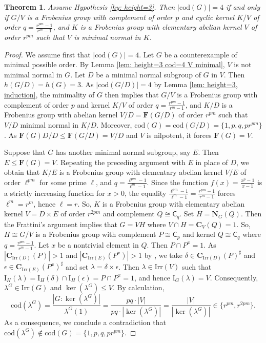 \documentclass[9pt]{article}
\newtheorem{thm}[lem]{\bf Theorem}
\begin{document}
\begin{thm}\label{thm: height=3}
	Assume Hypothesis \ref{hy: height=3}.
	Then $|\mathrm{cod}(G)|=4$
	if and only if $G/V$ is a Frobenius group with complement of order $p$ and cyclic kernel $K/V$
	of order $q=\frac{r^{pm}-1}{r^m-1}$,
	and $K$ is a Frobenius group with elementary abelian kernel $V$ of order $r^{pm}$ such that $V$ is minimal normal in $K$.	
\end{thm}
\begin{proof}
	We assume first that $|\mathrm{cod}(G)|=4$.
    Let $G$ be a counterexample of minimal possible order.
    By Lemma \ref{lem: height=3 cod=4 V minimal}, $V$ is not minimal normal in $G$.
	Let $D$ be a minimal normal subgroup of $G$ in $V$.
	Then $h(G/D)=h(G)=3$.
    As $|\mathrm{cod}(G/D)|=4$ by Lemma \ref{lem: height=3, induction},
    the minimality of $G$ then implies that
	$G/V$ is a Frobenius group with complement of order $p$ and kernel $K/V$
	of order $q=\frac{r^{pm}-1}{r^m-1}$,
	and $K/D$ is a Frobenius group with abelian kernel $V/D=\mathbf{F}(G/D)$ of order $r^{pm}$ such that $V/D$ minimal normal in $K/D$. 
    Moreover, $\mathrm{cod}(G)=\mathrm{cod}(G/D)=\{ 1,p,q,pr^{pm} \}$.
	As $\mathbf{F}(G)D/D\leq \mathbf{F}(G/D)= V/D$ and $V$ is nilpotent, it forces $\mathbf{F}(G)= V$.

    
	Suppose that $G$ has another minimal normal subgroup, say $E$.
	Then $E\leq \mathbf{F}(G)=V$.
    Repeating the preceding argument with $E$ in place of $D$,
    we obtain that 
	 $K/E$ is a Frobenius group with elementary abelian kernel $V/E$ of order $\ell^{pm}$ for some prime $\ell$, and $q=\frac{\ell^{pm}-1}{\ell^{m}-1}$.
	Since the function $f(x)=\frac{x^{p}-1}{x-1}$ is a strictly increasing function for $x>0$,
    the equality $\frac{\ell^{pm}-1}{\ell^{m}-1}=\frac{r^{pm}-1}{r^{m}-1}$ forces
    $\ell^{m}=r^{m}$, hence $\ell=r$.
    So, $K$ is a Frobenius group with elementary abelian kernel $V=D\times E$ of order $r^{2pm}$ and complement $Q\cong \mathsf{C}_{q}$.
	Set $H=\mathbf{N}_{G}(Q)$.
	Then the Frattini's argument implies that $G=VH$ where $V\cap H=\mathbf{C}_{V}(Q)=1$.
	So, $H\cong G/V$ is a Frobenius group with complement $P\cong \mathsf{C}_{p}$ and kernel $Q\cong \mathsf{C}_{q}$ where $q=\frac{r^{pm}-1}{r^{m}-1}$.
	Let $x$ be a nontrivial element in $Q$.
	Then $P \cap P^{x}=1$.
    As $|\mathbf{C}_{\mathrm{Irr}(D)}(P)|>1$ and $|\mathbf{C}_{\mathrm{Irr}(E)}(P^{x})|>1$ by \cite[Theorem 15.16]{isaacs1994},
	we take $\delta\in \mathbf{C}_{\mathrm{Irr}(D)}(P)^\sharp$ and $\epsilon \in \mathbf{C}_{\mathrm{Irr}(E)}(P^{x})^\sharp$ and set $\lambda=\delta\times \epsilon$.
    Then $\lambda\in \mathrm{Irr}(V)$ such that
	$\mathrm{I}_{H}(\lambda)=\mathrm{I}_{H}(\delta)\cap \mathrm{I}_{H}(\epsilon)=P\cap P^{x}=1$, and hence $\mathrm{I}_{G}(\lambda)=V$.
	Consequently, $\lambda^{G}\in \mathrm{Irr}(G)$ and
	$\ker(\lambda^{G})\leq V$.
	By calculation,
	$$\mathrm{cod}(\lambda^{G})=\frac{|G:\ker(\lambda^{G})|}{\lambda^{G}(1)}=\frac{pq\cdot |V|}{pq\cdot |\ker(\lambda^{G})|}=\frac{|V|}{|\ker(\lambda^{G})|}\in \{ r^{pm}, r^{2pm} \}.$$
    As 
	a consequence, we conclude a contradiction that $\mathrm{cod}(\lambda^{G})\notin \mathrm{cod}(G)=\{ 1,p,q,pr^{pm} \}$.
	

\end{proof}
\end{document}
